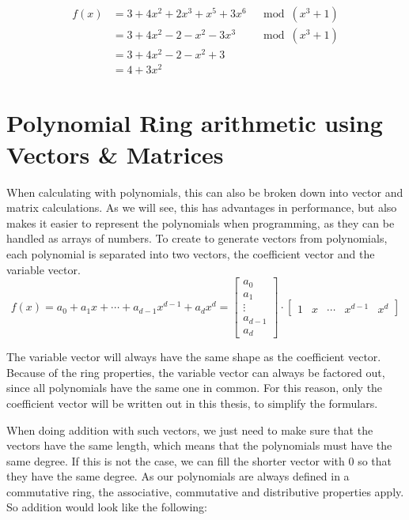 \begin{align*}
  f(x) & = 3+4x^2+2x^3+x^5+3x^6 & \mod (x^3+1) \\
    & = 3+4x^2-2-x^2-3x^3    & \mod (x^3+1) \\
    & = 3+4x^2-2-x^2+3                      \\
    & = 4+3x^2
\end{align*}

\section{Polynomial Ring arithmetic using Vectors \& Matrices}
\label{sec:PolyMulMath}

When calculating with polynomials, this can also be broken down into vector and matrix calculations. As we will see, this has advantages in performance, but also makes it easier to represent the polynomials when programming, as they can be handled as arrays of numbers. To create to generate vectors from polynomials, each polynomial is separated into two vectors, the coefficient vector and the variable vector.
$$
  f(x) = a_0+ a_1x+\cdots+ a_{d-1}x^{d-1}+a_dx^d =
  \begin{bmatrix}a_0\\a_1\\ \vdots \\a_{d-1}\\a_d \end{bmatrix}
  \cdot
  \begin{bmatrix}1 & x & \cdots & x^{d-1} &  x^d \end{bmatrix}
$$

The variable vector will always have the same shape as the coefficient vector. Because of the ring properties, the variable vector can always be factored out, since all polynomials have the same one in common. For this reason, only the coefficient vector will be written out in this thesis, to simplify the formulars.

When doing addition with such vectors, we just need to make sure that the vectors have the same length, which means that the polynomials must have the same degree. If this is not the case, we can fill the shorter vector with 0 so that they have the same degree. As our polynomials are always defined in a commutative  ring, the associative, commutative and distributive properties apply. So addition would look like the following:

